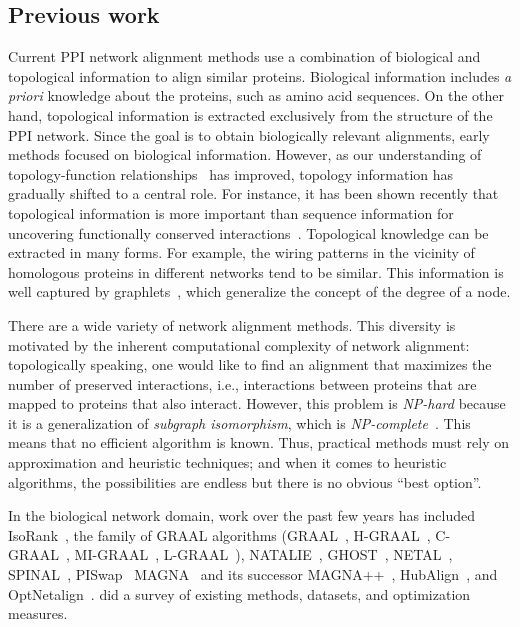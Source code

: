 \documentclass{bioinfo}
\begin{document}
\subsection{Previous work}\label{state}
Current PPI network alignment methods use a combination of biological and topological information to align similar proteins. Biological information includes \textit{a priori} knowledge about the proteins, such as amino acid sequences. On the other hand, topological information is extracted exclusively from the structure of the PPI network. Since the goal is to obtain biologically relevant alignments, early methods focused on biological information. However, as our understanding of topology-function
relationships~\citep{functionTopologyRelationship} has improved, topology information has gradually shifted to a central role. For instance, it has been shown recently that topological information is more important than sequence information for uncovering functionally conserved interactions~\citep{LGRAAL}.
Topological knowledge can be extracted in many forms. For example, the wiring patterns in the vicinity of homologous proteins in different networks tend to be similar. This information is well captured by graphlets~\citep{Przulj12122004}, which generalize the concept of the degree of a node.

There are a wide variety of network alignment methods. This diversity is motivated by the inherent computational complexity of network alignment: topologically speaking, one would like to find an alignment that maximizes the number of preserved interactions, i.e., interactions between proteins that are mapped to proteins that also interact. However, this problem is \textit{NP-hard} because it is a generalization of \textit{subgraph isomorphism}, which is \textit{NP-complete}~\citep{Cook:1971:CTP:800157.805047}. This means that no efficient algorithm is known. Thus, practical methods must rely on approximation and heuristic techniques; and when it comes to heuristic algorithms, the possibilities are endless but there is no obvious ``best option''.

In the biological network domain, work over the past few years has included IsoRank~\citep{Isorank}, the family of GRAAL algorithms (GRAAL~\citep{GRAAL}, H-GRAAL~\citep{HGRAAL}, C-GRAAL~\citep{CGRAAL}, MI-GRAAL~\citep{MIGRAAL}, L-GRAAL~\citep{LGRAAL}), NATALIE~\citep{NATALIE}, GHOST~\citep{GHOST}, NETAL~\citep{NETAL}, SPINAL~\citep{SPINAL}, PISwap~\citep{PISwap} MAGNA~\citep{MAGNA} and its successor MAGNA++~\citep{MAGNApp},  HubAlign~\citep{HubAlign}, and OptNetalign~\citep{optnetalign}. \cite{survey2015} did a survey of existing methods, datasets, and optimization measures.
\end{document}
